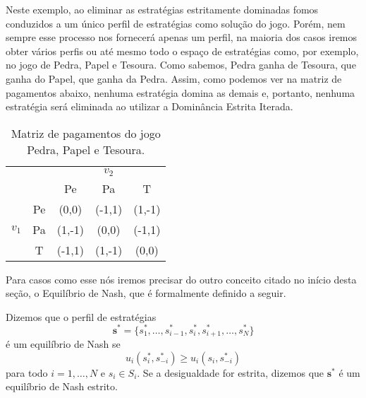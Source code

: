 Neste exemplo, ao eliminar as estratégias estritamente dominadas fomos conduzidos a um único perfil de estratégias como solução do jogo. Porém, nem sempre esse processo nos fornecerá apenas um perfil, na maioria dos casos iremos obter vários perfis ou até mesmo todo o espaço de estratégias como, por exemplo, no jogo de Pedra, Papel e Tesoura. Como sabemos, Pedra ganha de Tesoura, que ganha do Papel, que ganha da Pedra. Assim, como podemos ver na matriz de pagamentos abaixo, nenhuma estratégia domina as demais e, portanto, nenhuma estratégia será eliminada ao utilizar a Dominância Estrita Iterada.
\begin{table}[h]
\begin{center}
    \begin{tabular}{ccccc}
        & & & $v_2$ & \\
        & & Pe & Pa & T \\ \cline{3-5} 
        & \multicolumn{1}{c|}{Pe} & \multicolumn{1}{c|}{(0,0)}  & \multicolumn{1}{c|}{(-1,1)} & \multicolumn{1}{c|}{(1,-1)} \\ \cline{3-5} 
        $v_1$ & \multicolumn{1}{c|}{Pa} & \multicolumn{1}{c|}{(1,-1)} & \multicolumn{1}{c|}{(0,0)}  & \multicolumn{1}{c|}{(-1,1)} \\ \cline{3-5} 
         & \multicolumn{1}{c|}{T}  & \multicolumn{1}{c|}{(-1,1)} & \multicolumn{1}{c|}{(1,-1)} & \multicolumn{1}{c|}{(0,0)}  \\ \cline{3-5} 
    \end{tabular}
    \caption{Matriz de pagamentos do jogo Pedra, Papel e Tesoura.}
    \label{mppepat}
\end{center}
\end{table}

\FloatBarrier %

Para casos como esse nós iremos precisar do outro conceito citado no início desta seção, o Equilíbrio de Nash, que é formalmente definido a seguir.

\begin{definition}
    Dizemos que o perfil de estratégias
    \begin{equation*}
        \boldsymbol{s^*}=\{s^*_1,\dots,s^*_{i-1},s^*_i,s^*_{i+1},\dots,s^*_N\}
    \end{equation*}
    é um equilíbrio de Nash se
    \begin{equation}
        u_i(s^*_i,s^*_{-i})\geq u_i(s_i,s^*_{-i})
        \label{defEqNash}
    \end{equation}
    para todo $i=1,\dots,N$ e $s_i\in S_i$. Se a desigualdade for estrita, dizemos que $\boldsymbol{s^*}$ é um equilíbrio de Nash estrito.
\end{definition}

